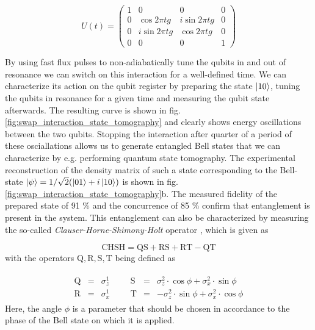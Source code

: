 \begin{equation}
	U(t)  =  \left( \begin{array}{cccc} 1 & 0 & 0 & 0 \\ 0 & \cos{2 \pi t g} & i\sin{2 \pi t g} & 0 \\ 0 & i\sin{2 \pi t g} & \cos{2 \pi t g} & 0 \\ 0 & 0 & 0 & 1 \end{array} \right) \label{eq:swap_evolution_operator}
\end{equation}


By using fast flux pulses to non-adiabatically tune the qubits in and out of resonance we can switch on this interaction for a well-defined time. We can characterize its action on the qubit register by preparing the state $\left| 10 \right>$, tuning the qubits in resonance for a given time and measuring the  qubit state afterwards. The resulting curve is shown in fig. \ref{fig:swap_interaction_state_tomography} and clearly shows energy oscillations between the two qubits. Stopping the interaction after quarter of a  period of these osciallations allows us to generate entangled Bell states that we can characterize by  e.g. performing quantum state tomography. The experimental reconstruction of the density matrix of such a state corresponding to the Bell-state $\left| \psi \right> = 1/\sqrt{2}(\left| 01 \right>+i\left| 10 \right>)$ is shown in fig. \ref{fig:swap_interaction_state_tomography}b. The measured fidelity of the prepared state of 91 \% and the concurrence of 85 \% confirm that entanglement is present in the system. This entanglement can also be characterized by measuring the so-called {\it Clauser-Horne-Shimony-Holt} operator \citep{clauser_proposed_1969}, which is given as

\begin{equation}
\mathrm{CHSH} = \mathrm{QS}+\mathrm{RS}+\mathrm{RT}-\mathrm{QT}
\end{equation}
with the operators $\mathrm{Q,R,S,T}$ being defined as

\begin{eqnarray}
	\begin{array}{cccccccc}
		\mathrm{Q} & = & \sigma_z^1 &&& \mathrm{S} & = & \sigma_z^2\cdot \cos{\phi}+\sigma_x^2 \cdot \sin{\phi} \\
		\mathrm{R} & = & \sigma_x^1 &&& \mathrm{T} & = & -\sigma_z^2\cdot \sin{\phi}+\sigma_x^2 \cdot \cos{\phi}
	\end{array}
\end{eqnarray} 
Here, the angle $\phi$ is a parameter that should be chosen in accordance to the phase of the Bell state on which it is applied.

